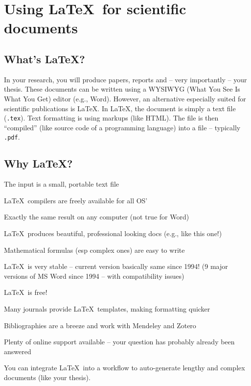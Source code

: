 \chapter{Using \LaTeX~for scientific documents}
\label{chap:latex}

\section{What's \LaTeX?} 

In your research, you will produce papers, reports and -- very 
importantly -- your thesis. These documents can be written using a 
WYSIWYG (What You See Is What You Get) editor (e.g., Word). However, an 
alternative especially suited for scientific publications is \LaTeX. In 
\LaTeX, the document is simply a text file ({\tt .tex}). Text 
formatting is using markups (like HTML). The file is then ``compiled'' 
(like source code of a programming language) into a file -- typically 
{\tt .pdf}. 

\section{Why \LaTeX?}

\begin{compactitem}
  \item The input is a small, portable text file
  \item \LaTeX~compilers are freely available for all OS'
  \item Exactly the same result on any computer (not true for Word)
  \item \LaTeX~produces beautiful, professional looking docs (e.g., like 
this one!)
  \item Mathematical formulas (esp complex ones) are easy to write
  \item \LaTeX~is very stable -- current version basically same since 1994! 
(9 major versions of MS Word since 1994 -- with compatibility issues)
    \item \LaTeX~is free!  
    \item Many journals provide \LaTeX~templates, making formatting quicker 
    \item Bibliographies are a breeze and work with Mendeley and Zotero
    \item Plenty of online support available -- your question has probably 
already been answered
    \item You can integrate \LaTeX~into a workflow to auto-generate lengthy 
and complex documents (like your thesis).  
\end{compactitem}


